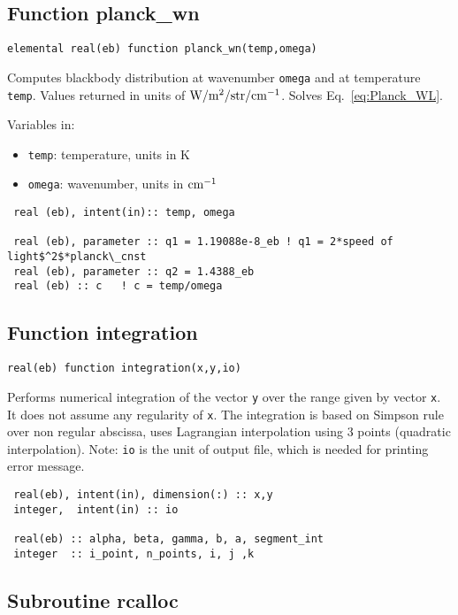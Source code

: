 \subsection{Function planck\_wn}

\begin{lstlisting}
elemental real(eb) function planck_wn(temp,omega)
\end{lstlisting}
Computes blackbody distribution at wavenumber \verb=omega= and at temperature \verb=temp=. Values returned in units of $\rm W/m^{2}/str/cm^{-1}$. Solves Eq.~\ref{eq:Planck_WL}.

Variables in:
\begin{itemize}
 \item \verb=temp=: temperature, units in K
 \item \verb=omega=: wavenumber, units in $\rm cm^{-1}$
\end{itemize}

\begin{lstlisting}
 real (eb), intent(in):: temp, omega

 real (eb), parameter :: q1 = 1.19088e-8_eb ! q1 = 2*speed of light$^2$*planck\_cnst
 real (eb), parameter :: q2 = 1.4388_eb
 real (eb) :: c   ! c = temp/omega
\end{lstlisting}


\subsection{Function integration}
\label{fun:integration}
\begin{lstlisting}
real(eb) function integration(x,y,io)
\end{lstlisting}
 Performs numerical integration of the vector \verb=y= over the range given by vector \verb=x=. It does not assume any regularity of \verb=x=. The integration is based on Simpson rule over non regular abscissa, uses Lagrangian interpolation using 3 points (quadratic interpolation). Note: \verb=io= is the unit of output file, which is needed for printing error message.

\begin{lstlisting}
 real(eb), intent(in), dimension(:) :: x,y
 integer,  intent(in) :: io

 real(eb) :: alpha, beta, gamma, b, a, segment_int
 integer  :: i_point, n_points, i, j ,k
\end{lstlisting}


\subsection{Subroutine rcalloc}

